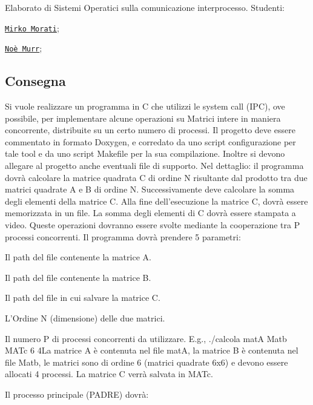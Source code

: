 Elaborato di Sistemi Operatici sulla comunicazione interprocesso. Studenti\+:


\begin{DoxyItemize}
\item \href{https://github.com/mirkomorati}{\tt Mirko Morati};
\item \href{https://github.com/NoeMurr}{\tt Noè Murr};
\end{DoxyItemize}

\subsection*{Consegna}

Si vuole realizzare un programma in C che utilizzi le system call (I\+PC), ove possibile, per implementare alcune operazioni su Matrici intere in maniera concorrente, distribuite su un certo numero di processi. Il progetto deve essere commentato in formato Doxygen, e corredato da uno script configurazione per tale tool e da uno script Makefile per la sua compilazione. Inoltre si devono allegare al progetto anche eventuali file di supporto. Nel dettaglio\+: il programma dovrà calcolare la matrice quadrata C di ordine N risultante dal prodotto tra due matrici quadrate A e B di ordine N. Successivamente deve calcolare la somma degli elementi della matrice C. Alla fine dell’esecuzione la matrice C, dovrà essere memorizzata in un file. La somma degli elementi di C dovrà essere stampata a video. Queste operazioni dovranno essere svolte mediante la cooperazione tra P processi concorrenti. Il programma dovrà prendere 5 parametri\+:


\begin{DoxyEnumerate}
\item Il path del file contenente la matrice A.
\item Il path del file contenente la matrice B.
\item Il path del file in cui salvare la matrice C.
\item L’\+Ordine N (dimensione) delle due matrici.
\item Il numero P di processi concorrenti da utilizzare. E.\+g., ./calcola matA Matb M\+A\+Tc 6 4\+La matrice A è contenuta nel file matA, la matrice B è contenuta nel file Matb, le matrici sono di ordine 6 (matrici quadrate 6x6) e devono essere allocati 4 processi. La matrice C verrà salvata in M\+A\+Tc.
\end{DoxyEnumerate}

Il processo principale (P\+A\+D\+RE) dovrà\+:


